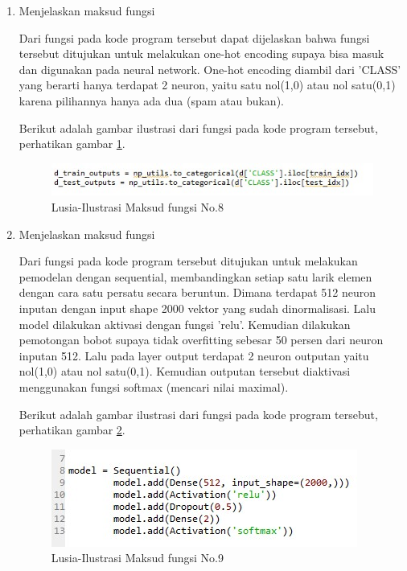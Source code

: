 \begin{enumerate}
\item Menjelaskan maksud fungsi
	
		
	\par Dari fungsi pada kode program tersebut dapat dijelaskan bahwa fungsi tersebut ditujukan untuk melakukan one-hot encoding supaya bisa masuk dan digunakan pada neural network. One-hot encoding diambil dari 'CLASS' yang berarti hanya terdapat 2 neuron, yaitu satu nol(1,0) atau nol satu(0,1) karena pilihannya hanya ada dua (spam atau bukan).
	\par Berikut adalah gambar ilustrasi dari fungsi pada kode program tersebut, perhatikan gambar \ref{7A8}.
		\begin{figure}[!hbtp]
		\centering
		\includegraphics[scale=0.4]{figures/v8.jpg}
		\caption{Lusia-Ilustrasi Maksud fungsi No.8}
		\label{7A8}
		\end{figure}

\item Menjelaskan maksud fungsi
	
	\par Dari fungsi pada kode program tersebut ditujukan untuk melakukan pemodelan dengan sequential, membandingkan setiap satu larik elemen dengan cara satu persatu secara beruntun. Dimana terdapat 512 neuron inputan dengan input shape 2000 vektor yang sudah dinormalisasi. Lalu model dilakukan aktivasi dengan fungsi 'relu'. Kemudian dilakukan pemotongan bobot supaya tidak overfitting sebesar 50 persen dari neuron inputan 512. Lalu pada layer output terdapat 2 neuron outputan yaitu nol(1,0) atau nol satu(0,1). Kemudian outputan tersebut diaktivasi menggunakan fungsi softmax (mencari nilai maximal).
	\par Berikut adalah gambar ilustrasi dari fungsi pada kode program tersebut, perhatikan gambar \ref{7A9}.
		\begin{figure}[!hbtp]
		\centering
		\includegraphics[scale=0.4]{figures/v9.jpg}
		\caption{Lusia-Ilustrasi Maksud fungsi No.9}
		\label{7A9}
		\end{figure}
		

\end{enumerate}
